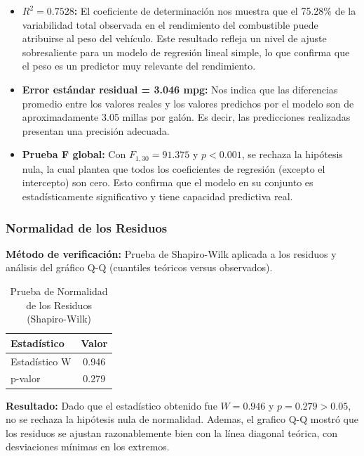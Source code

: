 \documentclass[12pt, letterpaper]{article}
\begin{document}
    \begin{itemize}
        \item \textbf{$R^{2} = 0.7528$:} El coeficiente de determinación nos muestra que
            el 75.28\% de la variabilidad total observada en el rendimiento del combustible puede atribuirse al peso del vehículo. Este resultado refleja un nivel de ajuste sobresaliente para un modelo de regresión lineal simple, lo que confirma que el peso  es
            un predictor muy relevante del rendimiento.

        \item \textbf{Error estándar residual = 3.046 mpg:} Nos indica que las diferencias promedio entre los valores reales y los valores predichos por el modelo son de aproximadamente 3.05 millas por galón. Es decir, las predicciones realizadas presentan una precisión adecuada. 

        \item \textbf{Prueba F global:} Con $F_{1,30} = 91.375$ y $p < 0.001$, se
            rechaza la hipótesis nula, la cual plantea que todos los coeficientes de regresión  (excepto
            el intercepto) son cero. Esto confirma que el modelo en su conjunto es
            estadísticamente significativo y tiene capacidad predictiva real.
    \end{itemize}

    \subsubsection{Normalidad de los Residuos}

    \textbf{Método de verificación:} Prueba de Shapiro-Wilk aplicada a los residuos
    y análisis del gráfico Q-Q (cuantiles teóricos versus observados).

    \begin{table}[H]
        \centering
        \caption{Prueba de Normalidad de los Residuos (Shapiro-Wilk)}
        \begin{tabular}{@{}lc@{}}
            \toprule 
            \textbf{Estadístico} & \textbf{Valor} \\
            \midrule 
            Estadístico W & 0.946 \\
            p-valor & 0.279 \\
            \bottomrule
        \end{tabular}
        \label{tab:normalidad_residuos}
    \end{table}

    \textbf{Resultado:} Dado que el estadístico obtenido fue  $W = 0.946$ y $p = 0.279 > 0.05$, no se rechaza la
    hipótesis nula de normalidad. Ademas, el grafico Q-Q mostró que los residuos se ajustan 
    razonablemente bien con la línea diagonal teórica, con desviaciones mínimas en
    los extremos.
\end{document}
